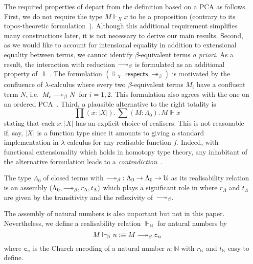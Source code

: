 \documentclass[a4paper,UKenglish,numberwithinsect,cleveref,thm-restate]{lipics-v2021}
\newcommand{\Nat}{\mathbb{N}}
\newcommand{\defeq}{\vcentcolon\equiv}
\newcommand{\Univ}{\mathcal{U}}
\DeclareRobustCommand\longtwoheadrightarrow{\relbar\joinrel\twoheadrightarrow}
\newcommand{\reduce}{\longtwoheadrightarrow_{\beta}}
\theoremstyle{plain}
\begin{document}
The required properties of  depart from the definition based on a PCA as follows. 
First, we do not require the type $M \Vdash_X x$ to be a proposition (contrary to its topos-theoretic formulation~\cite{Birkedal2002a}).
Although this additional requirement simplifies many constructions later, it is not necessary to derive our main results.
Second, as we would like to account for intensional equality in addition to extensional equality between terms,
we cannot identify $\beta$-equivalent terms \emph{a priori}.
As a result, the interaction with reduction $\reduce$ is formulated as an additional property of~$\Vdash$. 
The formulation $\left(\mathord{\Vdash_X}\;\mathsf{respects}\;\mathord{\twoheadrightarrow_\beta}\right)$ is motivated by the confluence of $\lambda$-calculus where every two $\beta$-equivalent terms $M_i$ have a confluent term $N$, i.e.\ $M_i \reduce N$ for $i = 1, 2$.
This formulation also agrees with the one on an ordered PCA~\cite[Section~2.3]{Hofstra2003}.
Third, a plausible alternative to the right totality is
\[
  \prod (x : |X|).\, \sum (M : \Lambda_0).\, M \Vdash x
\]
stating that each $x : |X|$ has an explicit choice of realisers.
This is not reasonable if, say, $|X|$ is a function type since it amounts to giving a standard implementation in $\lambda$-calculus for any realisable function $f$.
Indeed, with functional extensionality which holds in homotopy type theory, any inhabitant of the alternative formulation leads to a \emph{contradiction}~\cite{Troelstra1977}. 

\begin{example}\label{ex:assembly-lambda}
  The type $\Lambda_0$ of closed terms with ${\reduce} : \Lambda_0 \to \Lambda_0 \to \Univ$ as its realisability relation is an assembly $(\Lambda_0, \reduce, r_\Lambda, t_\Lambda)$ which plays a significant role in  where $r_\Lambda$ and $t_\Lambda$ are given by the transitivity and the reflexivity of~$\reduce$.
\end{example}

\begin{example}
  The assembly of natural numbers is also important but not in this paper.
  Nevertheless, we define a realisability relation $\Vdash_{\Nat}$ for natural numbers by
  \[
    M \Vdash_\Nat n \defeq M \reduce \mathtt{c}_n
  \]
  where $\mathtt{c}_n$ is the Church encoding of a natural number $n : \Nat$ with $r_\Nat$ and $t_\Nat$ easy to define. 
\end{example}
\end{document}
